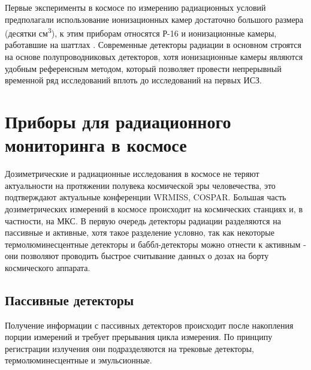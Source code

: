 Первые эксперименты в космосе по измерению радиационных условий предполагали использование ионизационных камер достаточно большого размера (десятки см\textsuperscript{3}), к этим приборам относятся Р-16 \cite{Mitricas2002} и ионизационные камеры, работавшие на шаттлах \cite{Dorman2004}. Современные детекторы радиации в основном строятся на основе полупроводниковых детекторов, хотя ионизационные камеры являются удобным референсным методом, который позволяет провести непрерывный временной ряд исследований вплоть до исследований на первых ИСЗ.


\section{Приборы для радиационного мониторинга в космосе} \label{sect1_3}

Дозиметрические и радиационные исследования в космосе не теряют актуальности на протяжении полувека космической эры человечества, это подтверждают актуальные  конференции WRMISS, COSPAR. Большая часть дозиметрических измерений в космосе происходит на космических станциях и, в частности, на МКС. 
В первую очередь детекторы радиации разделяются на пассивные и активные, хотя такое разделение условно, так как некоторые термолюминесцентные детекторы и баббл-детекторы можно отнести к активным - они позволяют проводить быстрое считывание данных о дозах на борту космического аппарата. 

\subsection{Пассивные детекторы} \label{subsect1_3_1}

Получение информации с пассивных детекторов происходит после накопления порции измерений и требует прерывания цикла измерения. По принципу регистрации излучения они подразделяются на трековые детекторы, термолюминесцентные \cite{Luszik-Bhadra1999,Kulkarni2011} и эмульсионные. 

